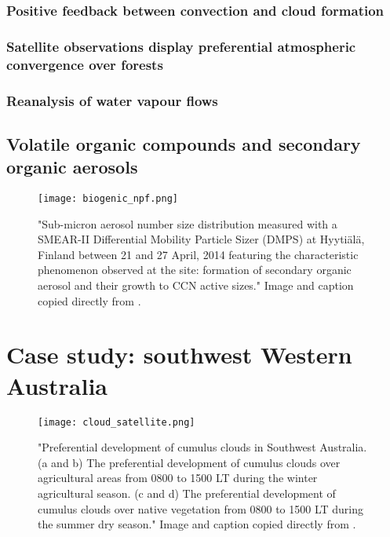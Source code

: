 \subsubsection{Positive feedback between convection and cloud formation}

\subsubsection{Satellite observations display preferential atmospheric convergence over forests}

\subsubsection{Reanalysis of water vapour flows}

\subsection[VOCs and SOAs]{Volatile organic compounds and secondary organic aerosols}

\begin{figure}[!ht]
	\centering
	\texttt{[image: biogenic\_npf.png]}
	\caption[Secondary organic aerosols growing into CCN active sizes]{"Sub-micron aerosol number size distribution measured with a SMEAR-II Differential Mobility Particle Sizer (DMPS) at Hyytiälä, Finland between 21 and 27 April, 2014 featuring the characteristic phenomenon observed at the site: formation of secondary organic aerosol and their growth to CCN active sizes." Image and caption copied directly from \citet{petaja2016}.}
	\label{fig:biogenic_npf}
\end{figure}

\section{Case study: southwest Western Australia}

\begin{figure}[!ht]
	\centering
	\texttt{[image: cloud\_satellite.png]}
	\caption[Satellite image of delineated cumulus development along fence]{"Preferential development of cumulus clouds in Southwest Australia. (a and b) The preferential development of cumulus clouds over agricultural areas from 0800 to 1500 LT during the winter agricultural season. (c and d) The preferential development of cumulus clouds over native vegetation from 0800 to 1500 LT during the summer dry season." Image and caption copied directly from \citet{ray2003}.}
	\label{fig:cloud_satellite}
\end{figure}